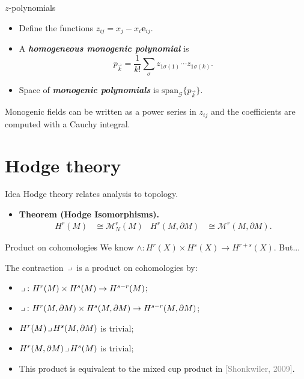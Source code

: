 \documentclass[aspectratio=169,handout]{beamer}
\newcommand\boldgreen[1]{\textcolor{lighter_csu_green}{\emph{\textbf{#1}}}}
\newcommand\boldgold[1]{\textcolor{csu_gold}{\textbf{#1}}}
\newcommand\grey[1]{\textcolor{gray}{#1}}
\newcommand{\G}{\mathcal{G}}
\newcommand{\monogenics}{\mathcal{M}}
\newcommand{\blade}[1]{\boldsymbol{#1}}
\newcommand{\boundary}{{\partial M}}
\newcommand{\contract}{\hspace*{.5mm} \lrcorner \hspace*{.5mm}}
\begin{document}
\begin{frame}{$z$-polynomials}
\vfill
\begin{itemize}
\pause
\item Define the functions $z_{ij}=x_j-x_i \blade{e}_{ij}$.
\pause
\item A \boldgreen{homogeneous monogenic polynomial} is
\[
p_{\vec{k}} = \frac{1}{k!} \sum_{\sigma} z_{1\sigma(1)}\cdots z_{1\sigma(k)}.
\]
\pause
\item Space of \boldgreen{monogenic polynomials} is $\mathrm{span}_\G \{p_{\vec{k}}\}$.
\end{itemize}
\pause
\begin{proposition*}{}{}
Monogenic fields can be written as a power series in $z_{ij}$ and the coefficients are computed with a Cauchy integral.
\end{proposition*}
\vfill
\end{frame}


\section{Hodge theory}

\begin{frame}{Idea}
\vfill
Hodge theory relates analysis to topology.
\begin{itemize}
  \pause
  \item \boldgold{Theorem (Hodge Isomorphisms).
  \begin{align*}
    H^r(M) &\cong \monogenics^r_N(M) & H^r(M,\boundary)&\cong \monogenics^r(M,\boundary).
  \end{align*}
  }
  \pause
\end{itemize}
\vspace*{-0.5cm}
\begin{figure}[H]
    \centering
    \def\svgwidth{.5\columnwidth}
\resizebox{.50\textwidth}{!}{}
\end{figure}
\vfill
\end{frame}

\begin{frame}{Product on cohomologies}
\vfill
\pause
We know $\wedge \colon H^r(X) \times H^s(X) \to H^{r+s}(X)$. \pause But...
\begin{proposition*}{}{}
The contraction $\contract$ is a product on cohomologies by:
\textcolor{lighter_csu_green}{
\begin{itemize}
\item $\contract \colon H^r(M)\times H^s(M) \to H^{s-r}(M)$;
\item $\contract \colon H^r(M,\boundary)\times H^s(M,\boundary) \to H^{s-r}(M,\boundary)$;
\item $H^r(M)\contract H^s(M,\boundary)$ is trivial;
\item $H^r(M,\boundary)\contract H^s(M)$ is trivial;
\end{itemize}
}
\end{proposition*}
\pause
\begin{itemize}
  \item This product is equivalent to the mixed cup product in \grey{[Shonkwiler, 2009]}.
\end{itemize}
\vfill
\end{frame}
\end{document}
